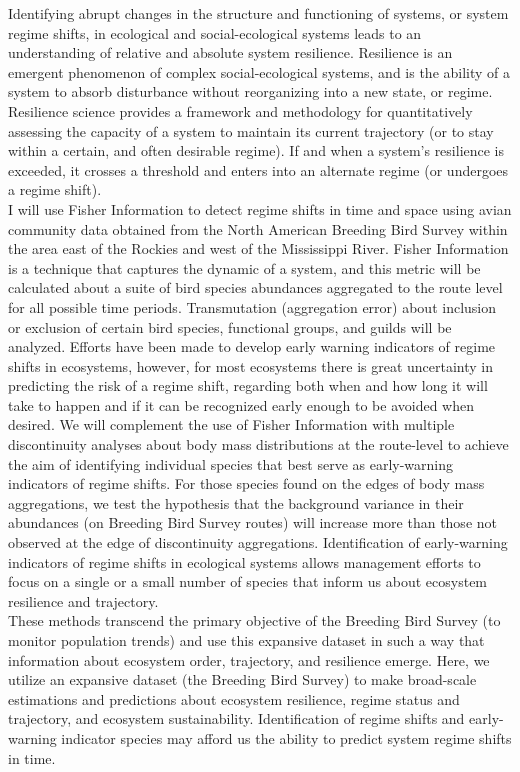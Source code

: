 \documentclass[12pt,twoside,openany]{reedthesis}
\begin{document}
Identifying abrupt changes in the structure and functioning of systems,
or system regime shifts, in ecological and social-ecological systems
leads to an understanding of relative and absolute system resilience.
Resilience is an emergent phenomenon of complex social-ecological
systems, and is the ability of a system to absorb disturbance without
reorganizing into a new state, or regime. Resilience science provides a
framework and methodology for quantitatively assessing the capacity of a
system to maintain its current trajectory (or to stay within a certain,
and often desirable regime). If and when a system's resilience is
exceeded, it crosses a threshold and enters into an alternate regime (or
undergoes a regime shift).\\
I will use Fisher Information to detect regime shifts in time and space
using avian community data obtained from the North American Breeding
Bird Survey within the area east of the Rockies and west of the
Mississippi River. Fisher Information is a technique that captures the
dynamic of a system, and this metric will be calculated about a suite of
bird species abundances aggregated to the route level for all possible
time periods. Transmutation (aggregation error) about inclusion or
exclusion of certain bird species, functional groups, and guilds will be
analyzed. Efforts have been made to develop early warning indicators of
regime shifts in ecosystems, however, for most ecosystems there is great
uncertainty in predicting the risk of a regime shift, regarding both
when and how long it will take to happen and if it can be recognized
early enough to be avoided when desired. We will complement the use of
Fisher Information with multiple discontinuity analyses about body mass
distributions at the route-level to achieve the aim of identifying
individual species that best serve as early-warning indicators of regime
shifts. For those species found on the edges of body mass aggregations,
we test the hypothesis that the background variance in their abundances
(on Breeding Bird Survey routes) will increase more than those not
observed at the edge of discontinuity aggregations. Identification of
early-warning indicators of regime shifts in ecological systems allows
management efforts to focus on a single or a small number of species
that inform us about ecosystem resilience and trajectory.\\
These methods transcend the primary objective of the Breeding Bird
Survey (to monitor population trends) and use this expansive dataset in
such a way that information about ecosystem order, trajectory, and
resilience emerge. Here, we utilize an expansive dataset (the Breeding
Bird Survey) to make broad-scale estimations and predictions about
ecosystem resilience, regime status and trajectory, and ecosystem
sustainability. Identification of regime shifts and early-warning
indicator species may afford us the ability to predict system regime
shifts in time.
\end{document}
